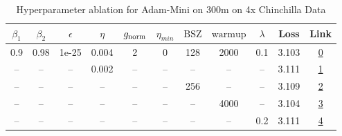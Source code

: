 \begin{table}[H]
\centering
\caption{Hyperparameter ablation for Adam-Mini on 300m on 4x Chinchilla Data}
\label{tab:ablation_adam-mini_300m_on_4x_chinchilla_data}
\begin{tabular}{ccccccccccc}
\toprule
$\beta_1$ & $\beta_2$ & $\epsilon$ & $\eta$ & $g_{\mathrm{norm}}$ & $\eta_{min}$ & $\mathrm{BSZ}$ & $\mathrm{warmup}$ & $\lambda$ & Loss & Link \\
\midrule
0.9 & 0.98 & 1e-25 & 0.004 & 2 & 0 & 128 & 2000 & 0.1 & 3.103 & \href{https://wandb.ai/marin-community/optimizer-scaling/runs/sweep-300m-24B-mini09d394lr0.004-wd0.1-minlr0-warmup2000-b10.9-b-4e8de7}{0} \\
\midrule
-- & -- & -- & 0.002 & -- & -- & -- & -- & -- & 3.111 & \href{https://wandb.ai/marin-community/optimizer-scaling/runs/sweep-300m-24B-mini5d38a2lr0.002-wd0.1-minlr0-warmup2000-b10.9-b-951b01}{1} \\
-- & -- & -- & -- & -- & -- & 256 & -- & -- & 3.109 & \href{https://wandb.ai/marin-community/optimizer-scaling/runs/sweep-300m-24B-minid571a7lr0.004-wd0.1-minlr0-warmup2000-b10.9-b-e475d2}{2} \\
-- & -- & -- & -- & -- & -- & -- & 4000 & -- & 3.104 & \href{https://wandb.ai/marin-community/optimizer-scaling/runs/sweep-300m-24B-mini0831d8lr0.004-wd0.1-minlr0-warmup4000-b10.9-b-41a654}{3} \\
-- & -- & -- & -- & -- & -- & -- & -- & 0.2 & 3.111 & \href{https://wandb.ai/marin-community/optimizer-scaling/runs/sweep-300m-24B-mini891741lr0.004-wd0.2-minlr0-warmup2000-b10.9-b-a97787}{4} \\
\bottomrule
\end{tabular}
\end{table}

